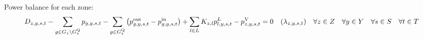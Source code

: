 \documentclass{article}
\newcommand{\sScenarioSets}{\quad \forall \iYear \in \sYears \quad \forall \iScenario \in \sScenarios \quad \forall \iInterval \in \sIntervals}
\begin{document}
Power balance for each zone:
\begin{equation}
\cDemand - \sum\limits_{\iGenerator \in \sGenerators_{\iZone} \setminus \sStorage_{\iZone}} \vPower - \sum\limits_{\iGenerator \in \sStorage_{\iZone}} \left(\vPowerOut - \vPowerIn\right) + \sum\limits_{\iLink \in \sLinks} \cIncidenceMatrix \vPowerFlow - \vLostLoadPower = 0 \quad (\dPowerBalance) \quad \forall \iZone \in \sZones \sScenarioSets
\end{equation}

%

%

%
\end{document}

